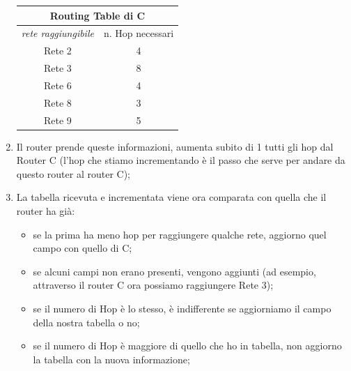 \begin{enumerate}
    \begin{table}[ht]
    \centering
    \begin{tabular}{cc}
    \multicolumn{2}{c}{Routing Table di C}                                                    \\ \hline
\multicolumn{1}{|c|}{\textit{rete raggiungibile}} & \multicolumn{1}{c|}{n. Hop necessari} \\ \hline
\multicolumn{1}{|c|}{Rete 2}                      & \multicolumn{1}{c|}{4}                \\ \hline
\multicolumn{1}{|c|}{Rete 3}                      & \multicolumn{1}{c|}{8}                \\ \hline
\multicolumn{1}{|c|}{Rete 6}                      & \multicolumn{1}{c|}{4}                \\ \hline
\multicolumn{1}{|c|}{Rete 8}                      & \multicolumn{1}{c|}{3}                \\ \hline
\multicolumn{1}{|c|}{Rete 9}                      & \multicolumn{1}{c|}{5}                \\ \hline
\end{tabular}
\end{table}
\item Il router prende queste informazioni, aumenta subito di 1 tutti gli hop dal Router C (l'hop che stiamo incrementando è il passo che serve per andare da questo router al router C);

\item La tabella ricevuta e incrementata viene ora comparata con quella che il router ha già: \begin{itemize}
    \item se la prima ha meno hop per raggiungere qualche rete, aggiorno quel campo con quello di C;
    \item se alcuni campi non erano presenti, vengono aggiunti (ad esempio, attraverso il router C ora possiamo raggiungere Rete 3);
    \item se il numero di Hop è lo stesso, è indifferente se aggiorniamo il campo della nostra tabella o no;
    \item se il numero di Hop è maggiore di quello che ho in tabella, non aggiorno la tabella con la nuova informazione;
\end{itemize}


\end{enumerate}
